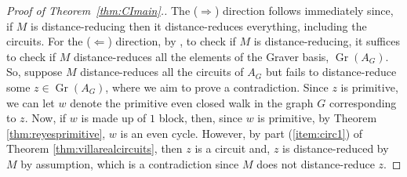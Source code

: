 \documentclass[a4paper, 12pt]{article}
\theoremstyle{plain}
\theoremstyle{definition}
\theoremstyle{remark}
\begin{document}
\begin{proof}[Proof of Theorem~\ref{thm:CImain}.]
    The ($\Rightarrow$) direction follows immediately since, if $M$ is distance-reducing then it distance-reduces everything, including the circuits. For the ($\Leftarrow$) direction, by \cite[Proposition 7.2]{CK_2024}, to check if $M$ is distance-reducing, it suffices to check if $M$ distance-reduces all the elements of the Graver basis, $\operatorname{Gr}(A_G)$. So, suppose $M$ distance-reduces all the circuits of $A_G$ but fails to distance-reduce some $z \in \operatorname{Gr}(A_G)$, where we aim to prove a contradiction. Since $z$ is primitive, we can let $w$ denote the primitive even closed walk in the graph $G$ corresponding to $z$. Now, if $w$ is made up of $1$ block, then, since $w$ is primitive, by Theorem \ref{thm:reyesprimitive}, $w$ is an even cycle. However, by part (\ref{item:circ1}) of Theorem \ref{thm:villarealcircuits}, then $z$ is a circuit and, $z$ is distance-reduced by $M$ by assumption, which is a contradiction since $M$ does not distance-reduce $z$.


\end{proof}
\end{document}
